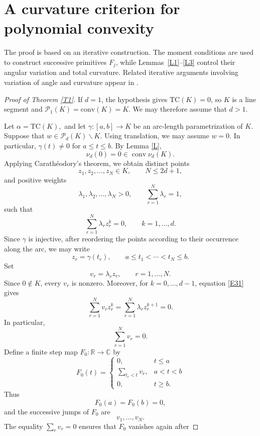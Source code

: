 \documentclass[reqno]{amsart}
\theoremstyle{definition}
\newcommand{\Conv}{{\mathrm{conv}}}
\newcommand{\T}{\mathrm{TC}}
\newcommand{\cP}{\mathcal{P}}
\numberwithin{equation}{section}
\begin{document}
\section{A curvature criterion for polynomial convexity}

The proof is based on an iterative construction. The moment conditions
are used to construct successive primitives $F_j$, while
Lemmas~\ref{L1}--\ref{L3} control their angular variation and total
curvature. Related iterative arguments involving variation of angle
and curvature appear in \cite[Section~3.2]{KY}.

\begin{proof}[Proof of Theorem \ref{T1}] If $d=1$, the hypothesis gives $\T(K)=0$, so $K$ is a line segment and $\cP_1(K)=\Conv(K)=K$. We may therefore assume that $d>1$.

Let $\alpha=\T(K),$ and let $\gamma:[a,b]\longrightarrow K$ be an arc-length parametrization of $K$. Suppose that $w\in \cP_d(K)\backslash K.$ Using translation, we may assume $w=0$. In particular, $\gamma(t)\neq 0$  for $a\le  t\leq b$.
By Lemma \ref{L},
\[\nu_d(0)=0\in\operatorname{conv}\nu_d(K).
\]
Applying Carath\'eodory's theorem, we obtain distinct points
\[z_1,z_2,\ldots,z_N\in K, \qquad N\leq 2d+1,
\]
and positive weights
\[
    \lambda_1,\lambda_2,\ldots,\lambda_N>0,
    \qquad
    \sum_{r=1}^N\lambda_r=1,
\]
such that
\begin{equation}
    \sum_{r=1}^N\lambda_r z_r^k=0,\qquad k=1,\ldots,d.
    \label{E31}
\end{equation}
Since $\gamma$ is injective, after reordering the points according to
their occurrence along the arc, we may write
\[z_r=\gamma(t_r),\qquad a\leq t_1<\cdots<t_N\leq b.\]
Set
\[v_r=\lambda_r z_r,\qquad r=1,\ldots,N.\]
Since $0\notin K$, every $v_r$ is nonzero. Moreover, for
$k=0,\ldots,d-1$, equation \eqref{E31} gives
\begin{equation}
    \sum_{r=1}^N v_r z_r^k=\sum_{r=1}^N\lambda_r z_r^{k+1}=0.
    \label{E32}
\end{equation}
In particular,
\[\sum_{r=1}^N v_r=0.\]
Define a finite step map $F_0:\mathbb R\to\mathbb C$ by
\[F_0(t) = \begin{cases}
    0, & t\le a\\ 
    \displaystyle\sum_{t_r<t}v_r, & a<t<b \\
    0, & t\ge b.
\end{cases}
\]
Thus
\[F_0(a)=F_0(b)=0,\]
and the successive jumps of $F_0$ are
\[v_1,\ldots,v_N.\]
The equality $\sum_r v_r=0$ ensures that $F_0$ vanishes again after

\end{proof}
\end{document}
